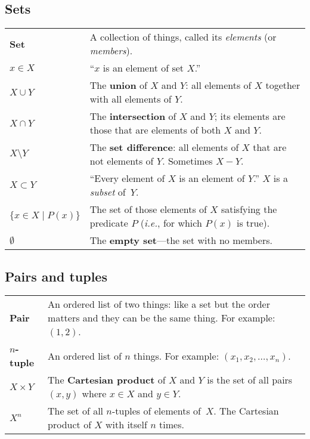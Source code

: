 \documentclass[10pt, a4paper, twocolumn]{article}
\newcommand{\defn}[1]{\textbf{\textsf{#1}}}
\begin{document}
\subsection*{Sets}
\begin{tabularx}{\columnwidth}{@{}p{}>{\raggedright\arraybackslash}X@{}}
  \toprule
  \defn{Set} & A collection of things, called its \emph{elements} (or \emph{members}). \\

  $x \in X$    & ``$x$ is an element of set $X$.'' \\

  $X\cup Y$     & The \defn{union} of $X$ and $Y$: all elements of $X$ together with all elements of $Y$. \\

  $X\cap Y$     & The \defn{intersection} of $X$ and $Y$; its elements are
  those that are elements of both $X$ and $Y$. \\

  $X \setminus Y$      & The \defn{set difference}: all elements of $X$ that are not elements of $Y$. Sometimes $X-Y$. \\

  $X \subset Y$    & ``Every element of $X$ is an element of $Y$.'' $X$ is a \emph{subset} of~$Y$. \\

  $\{x\in X\mid P(x)\}$ & The set of those elements of $X$ satisfying the
  predicate $P$ (\textit{i.e.}, for which $P(x)$ is true). \\

  $\emptyset$        & The \defn{empty set}---the set with no members. \\

\end{tabularx}

\subsection*{Pairs and tuples}
\begin{tabularx}{\columnwidth}{@{}p{}>{\raggedright\arraybackslash}X@{}}
  \toprule
  \defn{Pair} & An ordered list of two things: like a set but the order matters and they can be the same thing. For example: $(1, 2)$. \\
  
  \defn{$n$-tuple} & An ordered list of $n$ things. For example: $(x_1, x_2,\dotsc, x_n)$. \\

  $X\times Y$      & The \defn{Cartesian product} of $X$ and $Y$ is the set
  of all pairs $(x,y)$ where $x \in X$ and $y \in Y$. \\

  $X^n$ & The set of all $n$-tuples of elements of~$X$. The Cartesian product of $X$ with itself $n$ times. \\

\end{tabularx}
\end{document}
